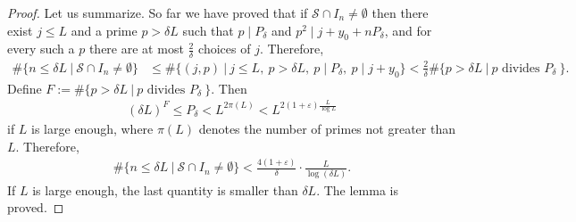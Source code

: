 \documentclass[10pt,a4paper]{amsart}
\begin{document}
\begin{proof}
Let us summarize. So far we have proved that if $\mathcal{S}\cap I_{n}\neq \emptyset$ then there exist $j\leq L$ and a prime $p>\delta L$ such that $p\mid P_{\delta}$ and $p^{2}\mid j+y_{0}+nP_{\delta}$, and for every such a $p$ there are at most $\frac{2}{\delta}$ choices of $j$. Therefore,
\begin{align*}
\#\{n\leq\delta L\ |\ \mathcal{S}\cap I_{n}\neq\emptyset\} &\leq \#\big\{ (j,p)\ \big|\ j\leq L,\ p>\delta L,\ p\mid P_{\delta},\ p\mid j+y_{0}\big\}<\frac{2}{\delta}\#\{ p>\delta L\ |\ p\textrm{ divides } P_{\delta}\ \}.
\end{align*}
Define $F:=\#\{ p>\delta L\ |\ p\textrm{ divides } P_{\delta}\ \}$. Then 
\begin{align*}
(\delta L)^{F}\leq P_{\delta}<L^{2\pi (L)}<L^{2(1+\varepsilon )\frac{L}{\log L}}
\end{align*}
if $L$ is large enough, where $\pi (L)$ denotes the number of primes not greater than $L$. Therefore,
\begin{align*}
\#\{n\leq \delta L\ |\ \mathcal{S}\cap I_{n}\neq\emptyset\}<\frac{4(1+\varepsilon )}{\delta}\cdot\frac{L}{\log (\delta L)}.
\end{align*}
If $L$ is large enough, the last quantity is smaller than $\delta L$. The lemma is proved.
\end{proof}
\end{document}
